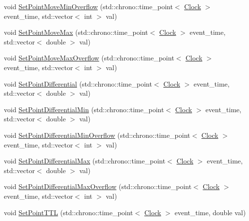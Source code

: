 \begin{DoxyCompactItemize}
void \hyperlink{class_point_a4a988ff988a3984545cf0c35e764c404}{Set\+Point\+Move\+Min\+Overflow} (std\+::chrono\+::time\+\_\+point$<$ \hyperlink{universe_8h_a0ef8d951d1ca5ab3cfaf7ab4c7a6fd80}{Clock} $>$ event\+\_\+time, std\+::vector$<$ int $>$ val)
\item 
void \hyperlink{class_point_afa3c2290a72c99e8892029eaa6676204}{Set\+Point\+Move\+Max} (std\+::chrono\+::time\+\_\+point$<$ \hyperlink{universe_8h_a0ef8d951d1ca5ab3cfaf7ab4c7a6fd80}{Clock} $>$ event\+\_\+time, std\+::vector$<$ double $>$ val)
\item 
void \hyperlink{class_point_a7c9776ffca2fde856fa8eaee669d9881}{Set\+Point\+Move\+Max\+Overflow} (std\+::chrono\+::time\+\_\+point$<$ \hyperlink{universe_8h_a0ef8d951d1ca5ab3cfaf7ab4c7a6fd80}{Clock} $>$ event\+\_\+time, std\+::vector$<$ int $>$ val)
\item 
void \hyperlink{class_point_adb977a2f01e7a2b549e1bd36fa6f5354}{Set\+Point\+Differential} (std\+::chrono\+::time\+\_\+point$<$ \hyperlink{universe_8h_a0ef8d951d1ca5ab3cfaf7ab4c7a6fd80}{Clock} $>$ event\+\_\+time, std\+::vector$<$ double $>$ val)
\item 
void \hyperlink{class_point_a944fcec52017ce88e052a576ef143926}{Set\+Point\+Differential\+Min} (std\+::chrono\+::time\+\_\+point$<$ \hyperlink{universe_8h_a0ef8d951d1ca5ab3cfaf7ab4c7a6fd80}{Clock} $>$ event\+\_\+time, std\+::vector$<$ double $>$ val)
\item 
void \hyperlink{class_point_a582e63ebdbb0979234acb460e673a393}{Set\+Point\+Differential\+Min\+Overflow} (std\+::chrono\+::time\+\_\+point$<$ \hyperlink{universe_8h_a0ef8d951d1ca5ab3cfaf7ab4c7a6fd80}{Clock} $>$ event\+\_\+time, std\+::vector$<$ int $>$ val)
\item 
void \hyperlink{class_point_ac2e53da4cbee0dc39c0b7a4d3e3a6ee5}{Set\+Point\+Differential\+Max} (std\+::chrono\+::time\+\_\+point$<$ \hyperlink{universe_8h_a0ef8d951d1ca5ab3cfaf7ab4c7a6fd80}{Clock} $>$ event\+\_\+time, std\+::vector$<$ double $>$ val)
\item 
void \hyperlink{class_point_a0b1ce0db9514762fc3aa9d57fa3034a0}{Set\+Point\+Differential\+Max\+Overflow} (std\+::chrono\+::time\+\_\+point$<$ \hyperlink{universe_8h_a0ef8d951d1ca5ab3cfaf7ab4c7a6fd80}{Clock} $>$ event\+\_\+time, std\+::vector$<$ int $>$ val)
\item 
void \hyperlink{class_point_a60ccff89b647d069146a596b8c43d123}{Set\+Point\+T\+TL} (std\+::chrono\+::time\+\_\+point$<$ \hyperlink{universe_8h_a0ef8d951d1ca5ab3cfaf7ab4c7a6fd80}{Clock} $>$ event\+\_\+time, double val)
\item 

\end{DoxyCompactItemize}
